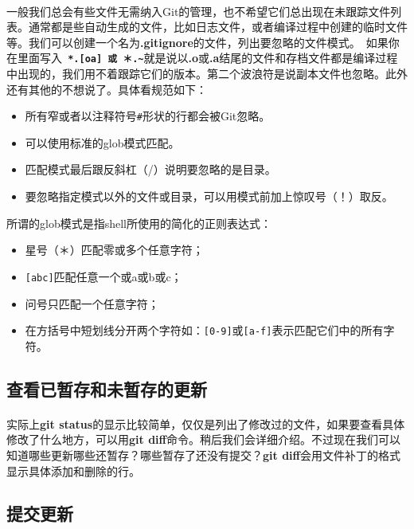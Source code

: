 \documentclass{book}
\begin{document}
	\paragraph{}
	一般我们总会有些文件无需纳入Git的管理，也不希望它们总出现在未跟踪文件列表。通常都是些自动生成的文件，比如日志文件，或者编译过程中创建的临时文件等。我们可以创建一个名为\textbf{.gitignore}的文件，列出要忽略的文件模式。\
	如果你在里面写入\textbf{\verb| *.[oa] 或 ＊.~|}就是说以\textbf{.o}或\textbf{.a}结尾的文件和存档文件都是编译过程中出现的，我们用不着跟踪它们的版本。第二个波浪符是说副本文件也忽略。此外还有其他的不想说了。具体看规范如下：\\
	\begin{itemize}
		\item 所有窄或者以注释符号\verb|#|形状的行都会被Git忽略。
		\item 可以使用标准的glob模式匹配。
		\item 匹配模式最后跟反斜杠（/）说明要忽略的是目录。
		\item 要忽略指定模式以外的文件或目录，可以用模式前加上惊叹号（！）取反。
	\end{itemize}
	所谓的glob模式是指shell所使用的简化的正则表达式：
	\begin{itemize}
		\item 星号（＊）匹配零或多个任意字符；
		\item \verb|[abc]|匹配任意一个或a或b或c；
		\item 问号只匹配一个任意字符；
		\item 在方括号中短划线分开两个字符如：\verb|[0-9]|或\verb|[a-f]|表示匹配它们中的所有字符。
	\end{itemize}
	\subsection{查看已暂存和未暂存的更新}
	\paragraph{}
	实际上\textbf{git status}的显示比较简单，仅仅是列出了修改过的文件，如果要查看具体修改了什么地方，可以用\textbf{git diff}命令。稍后我们会详细介绍。不过现在我们可以知道哪些更新哪些还暂存？哪些暂存了还没有提交？\textbf{git diff}会用文件补丁的格式显示具体添加和删除的行。\\
	\subsection{提交更新}
\end{document}
